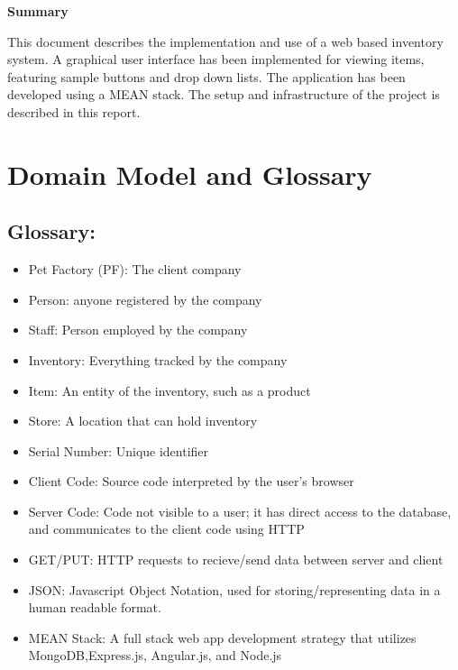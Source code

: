 \documentclass[letterpaper, 12pt]{article}
\title{\vspace{-8ex}}
\author{\vspace{-8ex}}
\date{\vspace{-7ex}}
\begin{document}
\fontsize{12}{12}
\maketitle
\thispagestyle{fancy}

%
%
\noindent \large\textbf{Summary}

\noindent This document describes the implementation and use of a web based inventory system. A graphical user interface has been implemented for viewing items, featuring sample buttons and drop down lists. The application has been developed using a MEAN stack. The setup and infrastructure of the project is described in this report.


\tableofcontents

\newpage
%
%
%
%
%
%
%
%
\section{Domain Model and Glossary}

\subsection{Glossary:}
%
%
\begin{itemize}
\item Pet Factory (PF): The client company
\item Person: anyone registered by the company
\item Staff: Person employed by the company
\item Inventory: Everything tracked by the company
\item Item: An entity of the inventory, such as a product
\item Store: A location that can hold inventory
\item Serial Number: Unique identifier
\item Client Code: Source code interpreted by the user's browser
\item Server Code: Code not visible to a user; it has direct access to the database, and communicates to the client code using HTTP
\item GET/PUT: HTTP requests to recieve/send data between server and client
\item JSON: Javascript Object Notation, used for storing/representing data in a human readable format.
\item MEAN Stack: A full stack web app development strategy that utilizes MongoDB,Express.js, Angular.js, and Node.js

\end{itemize}
\end{document}
